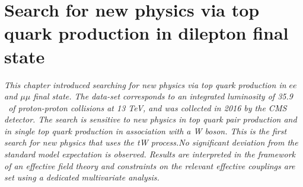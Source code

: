 \chapter{Search for new physics via top quark production in dilepton final state}\label{chap:tW}
\textit{This chapter introduced searching for new physics via top quark production in $ee$ and $\mu\mu$ final state. The data-set corresponds to an integrated luminosity of 35.9 \fbinv\ of proton-proton collisions at 13 TeV, and was collected in 2016 by the CMS detector. The search is sensitive to new physics in top quark pair production and in single top quark production in association with a W boson. This is the first search for new physics that uses the tW process.No significant deviation from the standard model expectation is observed.
Results are interpreted in the framework of an effective field theory and constraints on the relevant effective couplings are set using a dedicated multivariate analysis.}














